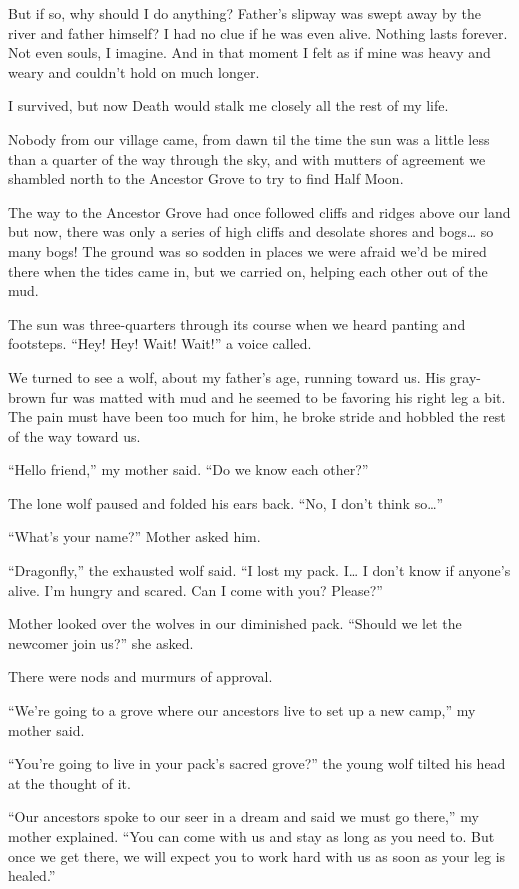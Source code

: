 But if so, why should I do anything? Father's slipway was swept away by the river and father himself? I had no clue if he was even alive. Nothing lasts forever. Not even souls, I imagine. And in that moment I felt as if mine was heavy and weary and couldn't hold on much longer.

I survived, but now Death would stalk me closely all the rest of my life.

\secdiv

Nobody from our village came, from dawn til the time the sun was a little less than a quarter of the way through the sky, and with mutters of agreement we shambled north to the Ancestor Grove to try to find Half Moon.

The way to the Ancestor Grove had once followed cliffs and ridges above our land but now, there was only a series of high cliffs and desolate shores and bogs\ldots{} so many bogs! The ground was so sodden in places we were afraid we'd be mired there when the tides came in, but we carried on, helping each other out of the mud.

The sun was three-quarters through its course when we heard panting and footsteps. ``Hey! Hey! Wait! Wait!'' a voice called.

We turned to see a wolf, about my father's age, running toward us. His gray-brown fur was matted with mud and he seemed to be favoring his right leg a bit. The pain must have been too much for him, he broke stride and hobbled the rest of the way toward us.

``Hello friend,'' my mother said. ``Do we know each other?''

The lone wolf paused and folded his ears back. ``No, I don't think so\ldots''

``What's your name?'' Mother asked him.

``Dragonfly,'' the exhausted wolf said. ``I lost my pack. I\ldots{} I don't know if anyone's alive. I'm hungry and scared. Can I come with you? Please?''

Mother looked over the wolves in our diminished pack. ``Should we let the newcomer join us?'' she asked.

There were nods and murmurs of approval.

``We're going to a grove where our ancestors live to set up a new camp,'' my mother said.

``You're going to live in your pack's sacred grove?'' the young wolf tilted his head at the thought of it.

``Our ancestors spoke to our seer in a dream and said we must go there,'' my mother explained. ``You can come with us and stay as long as you need to. But once we get there, we will expect you to work hard with us as soon as your leg is healed.''

